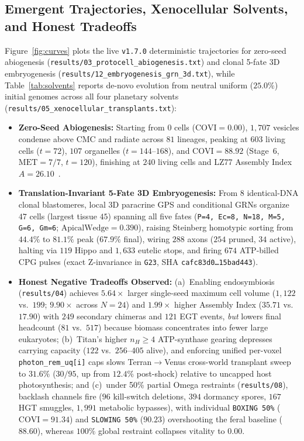 \documentclass[11pt,reqno]{amsart}
\theoremstyle{plain}
\theoremstyle{definition}
\theoremstyle{remark}
\newcommand{\code}[1]{{\footnotesize\nolinkurl{#1}}}
\begin{document}
\subsection{Emergent Trajectories, Xenocellular Solvents, and Honest Tradeoffs}
Figure~\ref{fig:curves} plots the live \texttt{v1.7.0} deterministic trajectories for zero-seed abiogenesis (\code{results/03_protocell_abiogenesis.txt}) and clonal 5-fate 3D embryogenesis (\code{results/12_embryogenesis_grn_3d.txt}), while Table~\ref{tab:solvents} reports de-novo evolution from neutral uniform ($25.0\%$) initial genomes across all four planetary solvents (\code{results/05_xenocellular_transplants.txt}):
\begin{itemize}[leftmargin=1.6em, itemsep=1.5pt]
  \item \textbf{Zero-Seed Abiogenesis:} Starting from $0$ cells ($\mathrm{COVI}=0.00$), $1{,}707$ vesicles condense above CMC and radiate across $81$ lineages, peaking at $603$ living cells ($t=72$), $107$ organelles ($t=144\text{--}168$), and $\mathrm{COVI} = 88.92$ (Stage~6, $\mathrm{MET}=7/7$, $t=120$), finishing at $240$ living cells and LZ77 Assembly Index $A = 26.10$~\cite{sharma2023}.
  \item \textbf{Translation-Invariant 5-Fate 3D Embryogenesis:} From $8$ identical-DNA clonal blastomeres, local 3D paracrine GPS and conditional GRNs organize $47$ cells (largest tissue $45$) spanning all five fates (\texttt{P=4, Ec=8, N=18, M=5, G=6, Gm=6}; $\mathrm{ApicalWedge}=0.390$), raising Steinberg homotypic sorting from $44.4\%$ to $81.1\%$ peak ($67.9\%$ final), wiring $288$ axons ($254$ pruned, $34$ active), halting via $119$ Hippo and $1{,}633$ eutelic stops, and firing $674$ ATP-billed CPG pulses (exact Z-invariance in \code{G23}, SHA \texttt{cafc83d0\ldots 15bad443}).
  \item \textbf{Honest Negative Tradeoffs Observed:} (a)~Enabling endosymbiosis (\code{results/04}) achieves $5.64\times$ larger single-seed maximum cell volume ($1{,}122$ vs.\ $199$; $9.90\times$ across $N=24$) and $1.99\times$ higher Assembly Index ($35.71$ vs.\ $17.90$) with $249$ secondary chimeras and $121$ EGT events, \emph{but} lowers final headcount ($81$ vs.\ $517$) because biomass concentrates into fewer large eukaryotes; (b)~Titan's higher $n_H \ge 4$ ATP-synthase gearing depresses carrying capacity ($122$ vs.\ $256\text{--}405$ alive), and enforcing unified per-voxel \code{photon_rem_uq[i]} caps slows Terran$\to$Venus cross-world transplant sweep to $31.6\%$ ($30/95$, up from $12.4\%$ post-shock) relative to uncapped host photosynthesis; and (c)~under 50\% partial Omega restraints (\code{results/08}), backlash channels fire ($96$ kill-switch deletions, $394$ dormancy spores, $167$ HGT smuggles, $1{,}991$ metabolic bypasses), with individual \texttt{BOXING 50\%} ($\mathrm{COVI}=91.34$) and \texttt{SLOWING 50\%} ($90.23$) overshooting the feral baseline ($88.60$), whereas $100\%$ global restraint collapses vitality to $0.00$.
\end{itemize}
\end{document}
